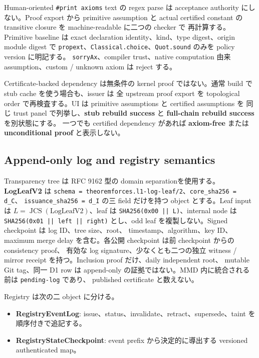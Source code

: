 \documentclass[a4paper,11pt]{ltjsarticle}
\newcommand{\term}[1]{\textbf{\color{TFNavy}#1}}
\newcommand{\code}[1]{\texttt{#1}}
\begin{document}
Human-oriented \code{\#print axioms} text の regex parse は acceptance authority にしない。Proof export から
primitive assumption と actual certified constant の transitive closure を machine-readable に二つの checker で
再計算する。Primitive baseline は exact declaration identity、kind、type digest、origin module digest で
\code{propext}、\code{Classical.choice}、\code{Quot.sound} のみを policy version に明記する。
\code{sorryAx}、compiler trust、native computation 由来 assumption、custom / unknown axiom は reject する。

Certificate-backed dependency は無条件の kernel proof ではない。通常 build で stub cache を使う場合も、issuer は
全 upstream proof export を topological order で再検査する。UI は primitive assumptions と certified assumptions を
同じ trust panel で列挙し、\term{stub rebuild success} と \term{full-chain rebuild success} を別状態にする。
一つでも certified dependency があれば \term{axiom-free} または \term{unconditional proof} と表示しない。

\subsection{Append-only log and registry semantics}

Transparency tree は RFC 9162 型の domain separationを使用する。\term{LogLeafV2} は
\code{schema = theoremforces.l1-log-leaf/2}、\code{core\_sha256 = d\_C}、
\code{issuance\_sha256 = d\_I} の三 field だけを持つ object とする。Leaf input は
$L=\operatorname{JCS}(\mathrm{LogLeafV2})$、leaf は
\code{SHA256(0x00 || L)}、internal node は
\code{SHA256(0x01 || left || right)} とし、odd leaf を複製しない。Signed checkpoint は log ID、tree size、root、
timestamp、algorithm、key ID、maximum merge delay を含む。各公開 checkpoint は前 checkpoint からの consistency proof、
有効な log signature、少なくとも二つの独立 witness / mirror receipt を持つ。Inclusion proof だけ、daily independent root、
mutable Git tag、同一 D1 row は append-only の証拠ではない。MMD 内に統合される前は \code{pending-log} であり、
published certificate と数えない。

Registry は次の二 object に分ける。

\begin{itemize}
  \item \term{RegistryEventLog}: issue、status、invalidate、retract、supersede、taint を順序付きで追記する。
  \item \term{RegistryStateCheckpoint}: event prefix から決定的に導出する versioned authenticated map。
\end{itemize}
\end{document}
